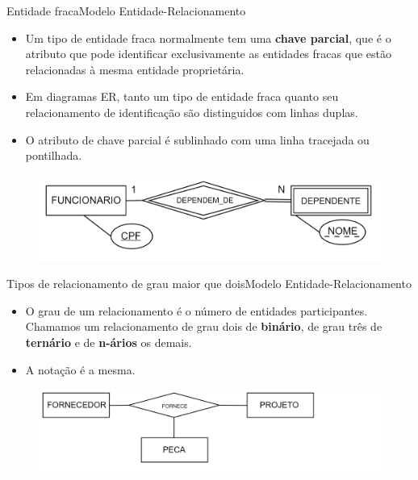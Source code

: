 \documentclass[t]{beamer}
\begin{document}

\begin{ftst}{Entidade fraca}{Modelo Entidade-Relacionamento}
\small
\begin{itemize}
    \item Um tipo de entidade fraca normalmente tem uma \textbf{chave parcial}, que é o atributo que pode identificar exclusivamente as entidades fracas que estão relacionadas à mesma entidade proprietária.
    \item Em diagramas ER, tanto um tipo de entidade fraca quanto seu relacionamento de identificação são distinguidos com linhas duplas. 
    \item O atributo de chave parcial é sublinhado com uma linha tracejada ou pontilhada.
\end{itemize}

\begin{figure}
    \centering
    \includegraphics[scale=0.2]{Figuras/01_23.png}
\end{figure}


\end{ftst}


\begin{ftst}{Tipos de relacionamento de grau maior que dois}{Modelo Entidade-Relacionamento}
\begin{itemize}
    \item O grau de um relacionamento é o número de entidades participantes. Chamamos um relacionamento de grau dois de \textbf{binário}, de grau três de \textbf{ternário} e de \textbf{n-ários} os demais.
    \item A notação é a mesma.
\end{itemize}

\begin{figure}
    \centering
    \includegraphics[scale=0.2]{Figuras/01_24.png}
\end{figure}

\end{ftst}
\end{document}
